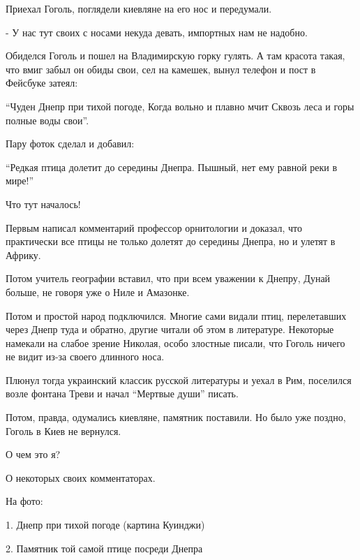 Приехал Гоголь, поглядели киевляне на его нос и передумали.

 - У нас тут своих с носами некуда девать, импортных нам не надобно.

Обиделся Гоголь и пошел на Владимирскую горку гулять. А там красота такая, что
вмиг забыл он обиды свои, сел на камешек, вынул телефон и пост в Фейсбуке
затеял:

\begin{zznagolos}
\enquote{Чуден Днепр при тихой погоде, 
Когда вольно и плавно мчит
Сквозь леса и горы полные воды свои}.
\end{zznagolos}

Пару фоток сделал и добавил:

\begin{zznagolos}
\enquote{Редкая птица долетит до середины Днепра.
Пышный, нет ему равной реки в мире!}
\end{zznagolos}

Что тут началось! 

Первым написал комментарий профессор орнитологии и доказал, что практически все
птицы не только долетят до середины Днепра, но и улетят в Африку.

\begin{multicols}{2}
\setlength{\parindent}{0pt}


\end{multicols}

Потом учитель географии вставил, что при всем уважении к Днепру, Дунай больше,
не говоря уже о Ниле и Амазонке.

Потом и простой народ подключился. Многие сами видали птиц, перелетавших через
Днепр туда и обратно, другие читали об этом в литературе. Некоторые намекали на
слабое зрение Николая, особо злостные писали, что Гоголь ничего не видит из-за
своего длинного носа.

Плюнул тогда украинский классик русской литературы и уехал в Рим, поселился
возле фонтана Треви и начал \enquote{Мертвые души} писать. 

Потом, правда, одумались киевляне, памятник поставили. Но было уже поздно,
Гоголь в Киев не вернулся.

О чем это я? 

О некоторых своих комментаторах.

На фото:

1. Днепр при тихой погоде (картина Куинджи)

2. Памятник той самой птице посреди Днепра

